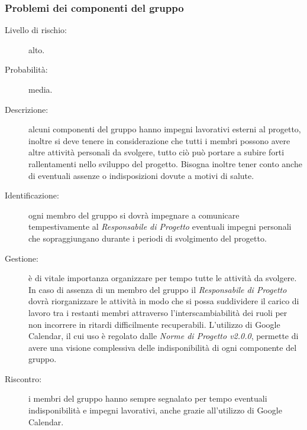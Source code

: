 \subsubsection{Problemi dei componenti del gruppo}
\begin{description}
	\item[Livello di rischio:] alto.
	\item[Probabilità:] media.
	\item[Descrizione:] alcuni componenti del gruppo hanno impegni lavorativi esterni al progetto, inoltre si deve tenere in considerazione che tutti i membri possono avere altre attività personali da svolgere, tutto ciò può portare a subire forti rallentamenti nello sviluppo del progetto. Bisogna inoltre tener conto anche di eventuali assenze o indisposizioni dovute a motivi di salute.
	\item[Identificazione:] ogni membro del gruppo si dovrà impegnare a comunicare tempestivamente al \textit{Responsabile di Progetto} eventuali impegni personali che sopraggiungano durante i periodi di svolgimento del progetto. 
	\item[Gestione:] è di vitale importanza organizzare per tempo tutte le attività da svolgere. In caso di assenza di un membro del gruppo il \textit{Responsabile di Progetto} dovrà riorganizzare le attività in modo che si possa suddividere il carico di lavoro tra i restanti membri attraverso l'interscambiabilità dei ruoli per non incorrere in ritardi difficilmente recuperabili. L'utilizzo di \gls{Google Calendar}, il cui uso è regolato dalle \textit{Norme di Progetto v2.0.0}, permette di avere una visione complessiva delle indisponibilità di ogni componente del gruppo. 
	\item[Riscontro:] i membri del gruppo hanno sempre segnalato per tempo eventuali indisponibilità e impegni lavorativi, anche grazie all'utilizzo di \gls{Google Calendar}.
\end{description}
